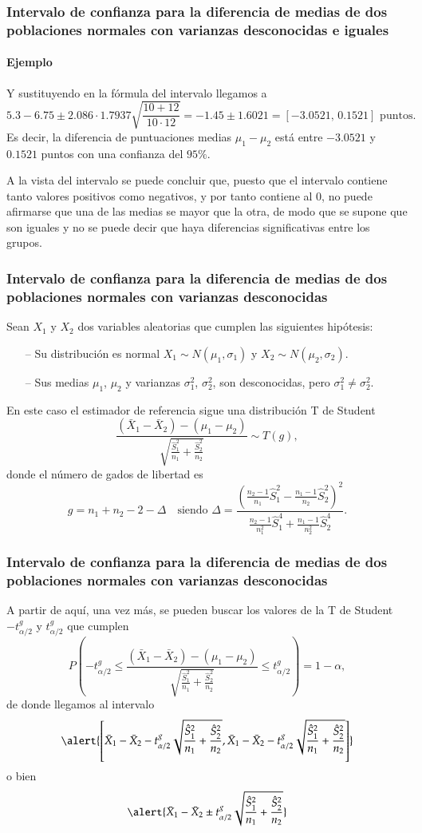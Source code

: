 \begin{frame}
\frametitle{Intervalo de confianza para la diferencia de medias de dos poblaciones normales con varianzas desconocidas
e iguales}
\framesubtitle{Ejemplo}
Y sustituyendo en la fórmula del intervalo llegamos a 
\[
5.3-6.75 \pm 2.086\cdot 1.7937\sqrt{\frac{10+12}{10\cdot 12}} = -1.45\pm 1.6021 = [-3.0521,\,0.1521] \text{ puntos}.
\]
Es decir, la diferencia de puntuaciones medias $\mu_1-\mu_2$ está entre $-3.0521$ y $0.1521$ puntos con una confianza
del $95\%$.

A la vista del intervalo se puede concluir que, puesto que el intervalo contiene tanto valores positivos como
negativos, y por tanto contiene al 0, no puede afirmarse que una de las medias se mayor que la otra, de modo que se
supone que son iguales y no se puede decir que haya diferencias significativas entre los grupos.
\end{frame}


\begin{frame}
\frametitle{Intervalo de confianza para la diferencia de medias de dos poblaciones normales con varianzas desconocidas}
Sean $X_1$ y $X_2$ dos variables aleatorias que cumplen las siguientes hipótesis:
\begin{itemize}
\item[--] Su distribución es normal $X_1\sim N(\mu_1,\sigma_1)$ y $X_2\sim N(\mu_2,\sigma_2)$.
\item[--] Sus medias $\mu_1$, $\mu_2$ y varianzas $\sigma_1^2$, $\sigma_2^2$, son desconocidas, pero $\sigma^2_1\not =
\sigma^2_2$.
\end{itemize}
En este caso el estimador de referencia sigue una distribución T de Student
\[
\frac{(\bar{X}_1-\bar{X}_2)-(\mu_1-\mu_2)}{\sqrt{\frac{\hat{S}^2_1}{n_1}+\frac{\hat{S}^2_2}{n_2}}} \sim T(g),
\]
donde el número de gados de libertad es
\[
g=n_1+n_2-2-\Delta\quad \text{siendo } \Delta =
\frac{(\frac{n_2-1}{n_1}\hat{S}_1^2-\frac{n_1-1}{n_2}\hat{S}_2^2)^2}{\frac{n_2-1}{n_1^2}\hat{S}_1^4+\frac{n_1-1}{n_2^2}\hat{S}_2^4}.
\] 
\end{frame}


\begin{frame}
\frametitle{Intervalo de confianza para la diferencia de medias de dos poblaciones normales con varianzas desconocidas}
A partir de aquí, una vez más, se pueden buscar los valores de la T de Student $-t^{g}_{\alpha/2}$ y $t^{g}_{\alpha/2}$ que cumplen
\[
P\left(-t^{g}_{\alpha/2}\leq \frac{(\bar{X}_1-\bar{X}_2)-(\mu_1-\mu_2)}{\sqrt{\frac{\hat{S}^2_1}{n_1}+\frac{\hat{S}^2_2}{n_2}}} \leq t^{g}_{\alpha/2}\right) = 1-\alpha,
\]
de donde llegamos al intervalo
\[
\alert{\left[\bar{X}_1-\bar{X}_2-t^{g}_{\alpha/2}\sqrt{\frac{\hat{S}^2_1}{n_1}+\frac{\hat{S}^2_2}{n_2}},\bar{X}_1-\bar{X}_2-t^{g}_{\alpha/2}\sqrt{\frac{\hat{S}^2_1}{n_1}+\frac{\hat{S}^2_2}{n_2}}\right]}
\]
o bien
\[
\alert{\bar{X}_1-\bar{X}_2\pm t^{g}_{\alpha/2}\sqrt{\frac{\hat{S}^2_1}{n_1}+\frac{\hat{S}^2_2}{n_2}}}
\]
\end{frame}


